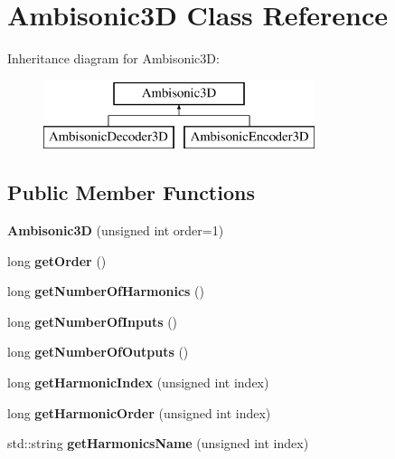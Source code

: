 \hypertarget{class_ambisonic3_d}{\section{Ambisonic3\-D Class Reference}
\label{class_ambisonic3_d}
}
Inheritance diagram for Ambisonic3\-D\-:\begin{figure}[H]
\begin{center}
\leavevmode
\includegraphics[height=2.000000cm]{class_ambisonic3_d}
\end{center}
\end{figure}
\subsection*{Public Member Functions}
\begin{DoxyCompactItemize}
\item 
\hypertarget{class_ambisonic3_d_a9e5c102c4198fe620e5a08e612714488}{{\bfseries Ambisonic3\-D} (unsigned int order=1)}\label{class_ambisonic3_d_a9e5c102c4198fe620e5a08e612714488}

\item 
\hypertarget{class_ambisonic3_d_a122f538beab6cecd937494795d9fea68}{long {\bfseries get\-Order} ()}\label{class_ambisonic3_d_a122f538beab6cecd937494795d9fea68}

\item 
\hypertarget{class_ambisonic3_d_a0def8cb523b6f09d704bb78c7104ff6d}{long {\bfseries get\-Number\-Of\-Harmonics} ()}\label{class_ambisonic3_d_a0def8cb523b6f09d704bb78c7104ff6d}

\item 
\hypertarget{class_ambisonic3_d_ad6729e3265d85ebbca09c8dc7b88ae0a}{long {\bfseries get\-Number\-Of\-Inputs} ()}\label{class_ambisonic3_d_ad6729e3265d85ebbca09c8dc7b88ae0a}

\item 
\hypertarget{class_ambisonic3_d_a7c94c05cb033a8f84ae5a92b20896c25}{long {\bfseries get\-Number\-Of\-Outputs} ()}\label{class_ambisonic3_d_a7c94c05cb033a8f84ae5a92b20896c25}

\item 
\hypertarget{class_ambisonic3_d_a09484904bb8284cd64985ad341485e34}{long {\bfseries get\-Harmonic\-Index} (unsigned int index)}\label{class_ambisonic3_d_a09484904bb8284cd64985ad341485e34}

\item 
\hypertarget{class_ambisonic3_d_ab7bf8e739e5af928ddd905aaf3c179d9}{long {\bfseries get\-Harmonic\-Order} (unsigned int index)}\label{class_ambisonic3_d_ab7bf8e739e5af928ddd905aaf3c179d9}

\item 
\hypertarget{class_ambisonic3_d_a311859b42feeaa04111382fe499eadb2}{std\-::string {\bfseries get\-Harmonics\-Name} (unsigned int index)}\label{class_ambisonic3_d_a311859b42feeaa04111382fe499eadb2}

\end{DoxyCompactItemize}
